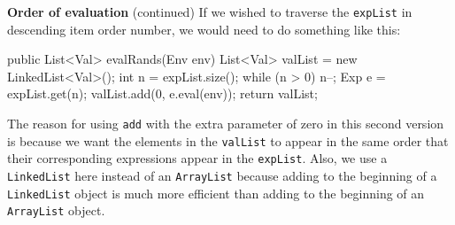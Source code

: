 \begin{minipage}[t]{\sw}
\slidenumber
\LARGE
{\bf Order of evaluation} (continued)\exx
If we wished to traverse the \verb'expList' in descending item order number,
we would need to do something like this:
\begin{qv}
public List<Val> evalRands(Env env) {
    List<Val> valList = new LinkedList<Val>();
    int n = expList.size();
    while (n > 0) {
        n--;
        Exp e = expList.get(n);
        valList.add(0, e.eval(env));
    }
    return valList;
}
\end{qv}
The reason for using \verb'add' with the extra parameter of zero
in this second version is because
we want the elements in the \verb'valList' to appear
in the same order that their corresponding expressions appear
in the \verb'expList'.
Also, we use a \verb'LinkedList' here instead of an \verb'ArrayList'
because adding to the beginning of a \verb'LinkedList' object
is much more efficient than adding to the beginning
of an \verb'ArrayList' object.
\end{minipage}
